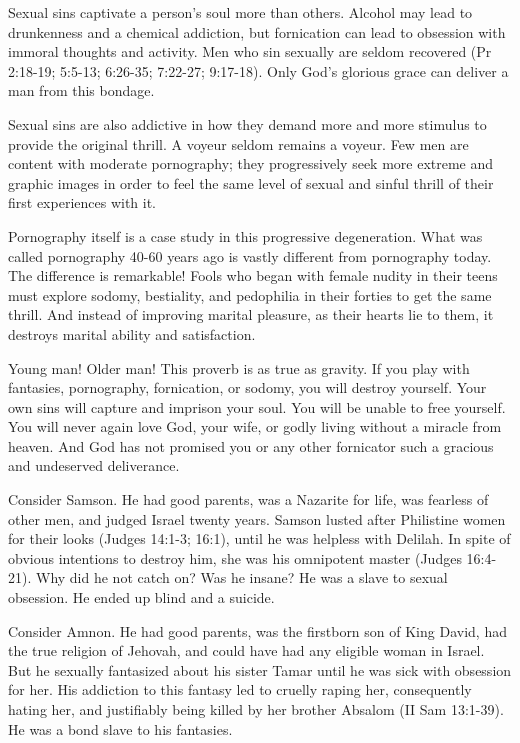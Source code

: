 Sexual sins captivate a person’s soul more than others. Alcohol may lead to drunkenness and a chemical addiction, but fornication can lead to obsession with immoral thoughts and activity. Men who sin sexually are seldom recovered (Pr 2:18-19; 5:5-13; 6:26-35; 7:22-27; 9:17-18). Only God’s glorious grace can deliver a man from this bondage.

Sexual sins are also addictive in how they demand more and more stimulus to provide the original thrill. A voyeur seldom remains a voyeur. Few men are content with moderate pornography; they progressively seek more extreme and graphic images in order to feel the same level of sexual and sinful thrill of their first experiences with it.

Pornography itself is a case study in this progressive degeneration. What was called pornography 40-60 years ago is vastly different from pornography today. The difference is remarkable! Fools who began with female nudity in their teens must explore sodomy, bestiality, and pedophilia in their forties to get the same thrill. And instead of improving marital pleasure, as their hearts lie to them, it destroys marital ability and satisfaction.

Young man! Older man! This proverb is as true as gravity. If you play with fantasies, pornography, fornication, or sodomy, you will destroy yourself. Your own sins will capture and imprison your soul. You will be unable to free yourself. You will never again love God, your wife, or godly living without a miracle from heaven. And God has not promised you or any other fornicator such a gracious and undeserved deliverance.

Consider Samson. He had good parents, was a Nazarite for life, was fearless of other men, and judged Israel twenty years. Samson lusted after Philistine women for their looks (Judges 14:1-3; 16:1), until he was helpless with Delilah. In spite of obvious intentions to destroy him, she was his omnipotent master (Judges 16:4-21). Why did he not catch on? Was he insane? He was a slave to sexual obsession. He ended up blind and a suicide.

Consider Amnon. He had good parents, was the firstborn son of King David, had the true religion of Jehovah, and could have had any eligible woman in Israel. But he sexually fantasized about his sister Tamar until he was sick with obsession for her. His addiction to this fantasy led to cruelly raping her, consequently hating her, and justifiably being killed by her brother Absalom (II Sam 13:1-39). He was a bond slave to his fantasies.

